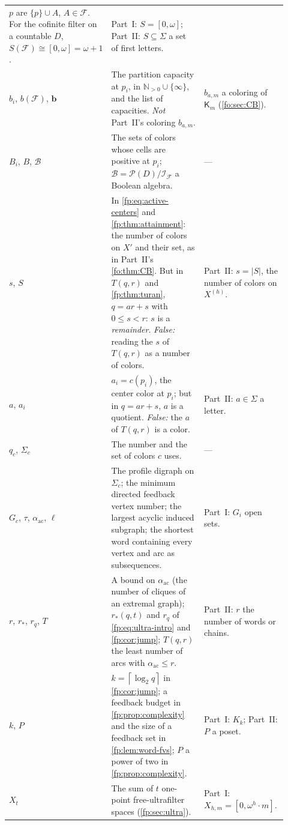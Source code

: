 \documentclass[11pt,letterpaper]{article}
\numberwithin{equation}{section}
\theoremstyle{definition}
\theoremstyle{remark}
\theoremstyle{definition}
\newcommand{\ceil}[1]{\left\lceil#1\right\rceil}
\newcommand{\N}{\mathbb N}
\newcommand{\Tw}{\mathsf K}
\newcommand{\F}{\mathcal F}
\newcommand{\I}{\mathcal I}
\newcommand{\B}{\mathcal B}
\newcommand{\PP}{\mathcal P}
\newcommand{\ac}{\alpha_{\mathrm{ac}}}
\begin{document}
\begin{center}
\begin{longtable}{@{}>{\raggedright\arraybackslash}p{0.13\linewidth}>{\raggedright\arraybackslash}p{0.44\linewidth}>{\raggedright\arraybackslash}p{0.35\linewidth}@{}}
$p$ are $\{p\}\cup A$, $A\in\F$. For the cofinite filter on a countable $D$,
$S(\F)\cong[0,\omega]=\omega+1$. & Part~I: $S=[0,\omega]$; Part~II:
$S\subseteq\Sigma$ a set of first letters.\\
$b_i$, $b(\F)$, $\boldsymbol b$ & The partition capacity at $p_i$, in
$\N_{>0}\cup\{\infty\}$, and the list of capacities. \emph{Not} Part~II's
coloring $b_{a,m}$. & $b_{a,m}$ a coloring of $\Tw_m$
(\cref{fo:sec:CB}).\\
$B_i$, $B$, $\B$ & The sets of colors whose cells are positive at $p_i$;
$\B=\PP(D)/\I_\F$ a Boolean algebra. & ---\\
$s$, $S$ & In \eqref{fp:eq:active-centers} and \cref{fp:thm:attainment}: the
number of colors on $X'$ and their set, as in Part~II's \cref{fo:thm:CB}. But
in $T(q,r)$ and \cref{fp:thm:turan}, $q=ar+s$ with $0\le s<r$: $s$ is a
\emph{remainder}. \emph{False:} reading the $s$ of $T(q,r)$ as a number of
colors. & Part~II: $s=\lvert S\rvert$, the number of colors on
$X^{(h)}$.\\
$a$, $a_i$ & $a_i=c(p_i)$, the center color at $p_i$; but in $q=ar+s$, $a$ is
a quotient. \emph{False:} the $a$ of $T(q,r)$ is a color. & Part~II: $a\in\Sigma$
a letter.\\
$q_c$, $\Sigma_c$ & The number and the set of colors $c$ uses. & ---\\
$G_c$, $\tau$, $\ac$, $\ell$ & The profile digraph on $\Sigma_c$; the minimum
directed feedback vertex number; the largest acyclic induced subgraph; the
shortest word containing every vertex and arc as subsequences. & Part~I:
$G_i$ open sets.\\
$r$, $r_*$, $r_q$, $T$ & A bound on $\ac$ (the number of cliques of an
extremal graph); $r_*(q,t)$ and $r_q$ of \eqref{fp:eq:ultra-intro} and
\cref{fp:cor:jump}; $T(q,r)$ the least number of arcs with $\ac\le r$. &
Part~II: $r$ the number of words or chains.\\
$k$, $P$ & $k=\ceil{\log_2q}$ in \cref{fp:cor:jump}; a feedback budget in
\cref{fp:prop:complexity} and the size of a feedback set in
\cref{fp:lem:word-fvs}; $P$ a power of two in \cref{fp:prop:complexity}. &
Part~I: $K_k$; Part~II: $P$ a poset.\\
$X_t$ & The sum of $t$ one-point free-ultrafilter spaces
(\cref{fp:sec:ultra}). & Part~I: $X_{h,m}=[0,\omega^h\cdot m]$.\\
\bottomrule
\end{longtable}
\end{center}
\end{document}

